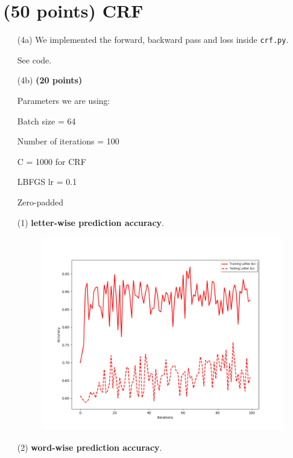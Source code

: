 \documentclass[11pt]{report}
\begin{document}
\clearpage
\section{(50 points) CRF}

\begin{itemize}
\item[(4a)] We implemented the forward, backward pass and loss inside
  \texttt{crf.py}. 

  See code.

\item[(4b)] \textbf{(20 points)} 

Parameters we are using:

Batch size = 64

Number of iterations = 100

C = 1000 for CRF

LBFGS lr = 0.1 

Zero-padded

(1) \textbf{letter-wise prediction accuracy}. 

\begin{figure}[h]
	\includegraphics[width = 15 cm]{./letteraccuracies_4b.png}
	\centering
\end{figure}


(2) \textbf{word-wise prediction accuracy}. 


\end{itemize}
\end{document}

